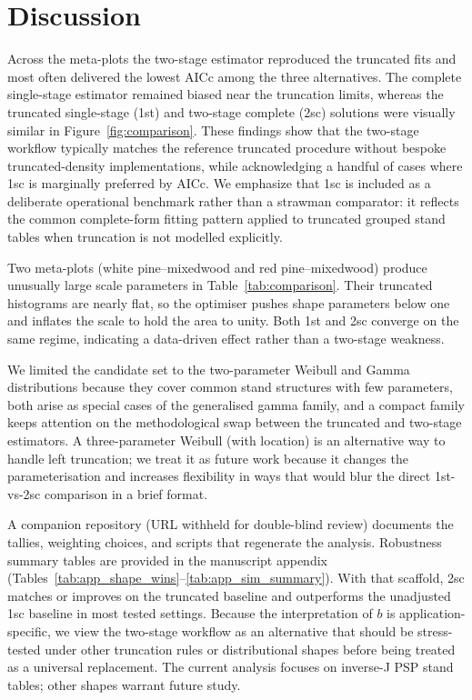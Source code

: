 \section{Discussion}

Across the meta-plots the two-stage estimator reproduced the truncated fits and most often delivered the lowest AICc among the three alternatives. The complete single-stage estimator remained biased near the truncation limits, whereas the truncated single-stage (1st) and two-stage complete (2sc) solutions were visually similar in Figure~\ref{fig:comparison}. These findings show that the two-stage workflow typically matches the reference truncated procedure without bespoke truncated-density implementations, while acknowledging a handful of cases where 1sc is marginally preferred by AICc.
We emphasize that 1sc is included as a deliberate operational benchmark rather than a strawman comparator: it reflects the common complete-form fitting pattern applied to truncated grouped stand tables when truncation is not modelled explicitly.

Two meta-plots (white pine--mixedwood and red pine--mixedwood) produce unusually large scale parameters in Table~\ref{tab:comparison}. Their truncated histograms are nearly flat, so the optimiser pushes shape parameters below one and inflates the scale to hold the area to unity. Both 1st and 2sc converge on the same regime, indicating a data-driven effect rather than a two-stage weakness.

We limited the candidate set to the two-parameter Weibull and Gamma distributions because they cover common stand structures with few parameters, both arise as special cases of the generalised gamma family, and a compact family keeps attention on the methodological swap between the truncated and two-stage estimators. A three-parameter Weibull (with location) is an alternative way to handle left truncation; we treat it as future work because it changes the parameterisation and increases flexibility in ways that would blur the direct 1st-vs-2sc comparison in a brief format.

A companion repository (URL withheld for double-blind review) documents the tallies, weighting choices, and scripts that regenerate the analysis. Robustness summary tables are provided in the manuscript appendix (Tables~\ref{tab:app_shape_wins}--\ref{tab:app_sim_summary}). With that scaffold, 2sc matches or improves on the truncated baseline and outperforms the unadjusted 1sc baseline in most tested settings. Because the interpretation of $b$ is application-specific, we view the two-stage workflow as an alternative that should be stress-tested under other truncation rules or distributional shapes before being treated as a universal replacement. The current analysis focuses on inverse-J PSP stand tables; other shapes warrant future study.

